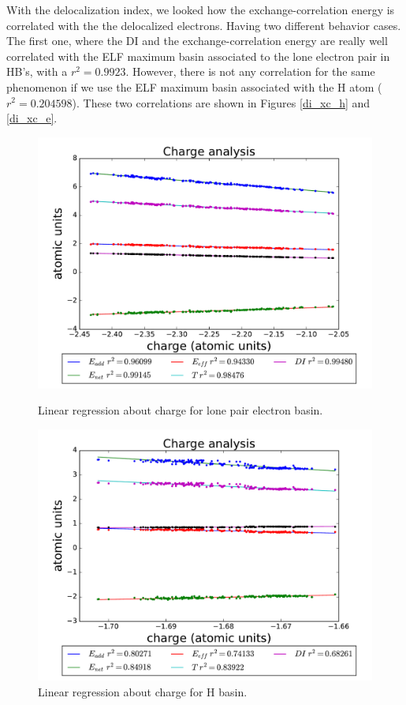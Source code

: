 With the delocalization index, we looked how the exchange-correlation energy is
correlated with the the delocalized electrons.  Having two different behavior
cases. The first one, where the DI and the exchange-correlation energy are
really well correlated with the ELF maximum basin associated to the lone
electron pair in HB's, with a $r^2 = 0.9923$. However, there is not any
correlation for the same phenomenon if we use the ELF maximum basin associated
with the H atom ($r^2 = 0.204598$). These two correlations are shown in Figures
\ref{di_xc_h} and \ref{di_xc_e}.

\begin{figure}[b!]
    \begin{minipage}[t]{0.48\textwidth}
      \centering
      \includegraphics[width=\textwidth]{4/plots/promelf/charge/chargee.pdf}
      \caption{Linear regression about charge for lone pair electron basin.}
      \label{rl_chargee}
    \end{minipage}%
    \hfill
    \begin{minipage}[t]{0.48\textwidth}
      \centering
      \includegraphics[width=\textwidth]{4/plots/promelf/charge/chargeH.pdf}
      \caption{Linear regression about charge for H basin.}
      \label{rl_chargeH}
    \end{minipage}%
\end{figure}

